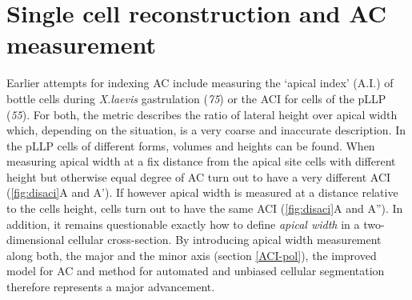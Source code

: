 \documentclass[11pt,singlespacinge,twoside]{reedthesis} %
\begin{document}
\hypertarget{single-cell-reconstruction-and-ac-measurement}{%
\section{Single cell reconstruction and AC measurement}\label{single-cell-reconstruction-and-ac-measurement}}

Earlier attempts for indexing AC include measuring the `apical index' (A.I.) of bottle cells during \emph{X.laevis} gastrulation (\emph{75}) or the ACI for cells of the pLLP (\emph{55}). For both, the metric describes the ratio of lateral height over apical width which, depending on the situation, is a very coarse and inaccurate description. In the pLLP cells of different forms, volumes and heights can be found. When measuring apical width at a fix distance from the apical site cells with different height but otherwise equal degree of AC turn out to have a very different ACI (\ref{fig:disaci}A and A'). If however apical width is measured at a distance relative to the cells height, cells turn out to have the same ACI (\ref{fig:disaci}A and A''). In addition, it remains questionable exactly how to define \emph{apical width} in a two-dimensional cellular cross-section. By introducing apical width measurement along both, the major and the minor axis (section \ref{ACI-pol}), the improved model for AC and method for automated and unbiased cellular segmentation therefore represents a major advancement.
\end{document}
